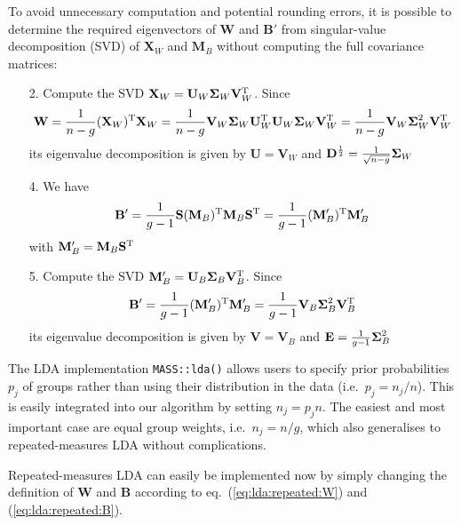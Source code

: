 \documentclass[a4paper]{article}
\begin{document}
To avoid unnecessary computation and potential rounding errors, it is possible to determine the required eigenvectors of $\mathbf{W}$ and $\mathbf{B}'$ from singular-value decomposition (SVD) of $\mathbf{X}_W$ and $\mathbf{M}_B$ without computing the full covariance matrices:

\begin{itemize}
\item[2.] Compute the SVD $\mathbf{X}_W = \mathbf{U}_W \boldsymbol{\Sigma}_W \mathbf{V}_W^{\text{T}}$. Since
  \[
    \mathbf{W} = \frac1{n - g} (\mathbf{X}_W)^{\text{T}} \mathbf{X}_W
    = \frac1{n - g} \mathbf{V}_W \boldsymbol{\Sigma}_W \mathbf{U}_W^{\text{T}} \mathbf{U}_W \boldsymbol{\Sigma}_W \mathbf{V}_W^{\text{T}}
    = \frac1{n - g} \mathbf{V}_W \boldsymbol{\Sigma}_W^2 \mathbf{V}_W^{\text{T}}
  \]
  its eigenvalue decomposition is given by $\mathbf{U} = \mathbf{V}_W$ and $\mathbf{D}^{\frac12} = \frac1{\sqrt{n - g}} \boldsymbol{\Sigma}_W$
\item[4.] We have
  \[
    \mathbf{B}' = \frac1{g - 1} \mathbf{S} (\mathbf{M}_B)^{\text{T}} \mathbf{M}_B \mathbf{S}^{\text{T}}
     = \frac1{g - 1} (\mathbf{M}_B')^{\text{T}} \mathbf{M}_B'
   \]
   with $\mathbf{M}_B' = \mathbf{M}_B \mathbf{S}^{\text{T}}$
\item[5.] Compute the SVD $\mathbf{M}_B' = \mathbf{U}_{B} \boldsymbol{\Sigma}_{B} \mathbf{V}_B^{\text{T}}$. Since
  \[
    \mathbf{B}' = \frac1{g - 1} (\mathbf{M}_B')^{\text{T}} \mathbf{M}_B'
    = \frac1{g - 1} \mathbf{V}_B \boldsymbol{\Sigma}_B^2 \mathbf{V}_B^{\text{T}}
  \]
  its eigenvalue decomposition is given by $\mathbf{V} = \mathbf{V}_B$ and $\mathbf{E} = \frac1{g - 1} \boldsymbol{\Sigma}_B^2$
\end{itemize}

The LDA implementation \texttt{MASS::lda()} allows users to specify prior probabilities $p_j$ of groups rather than using their distribution in the data (i.e.\ $p_j = n_j / n$). This is easily integrated into our algorithm by setting $n_j = p_j n$. The easiest and most important case are equal group weights, i.e.\ $n_j = n / g$, which also generalises to repeated-measures LDA without complications.

Repeated-measures LDA can easily be implemented now by simply changing the definition of $\mathbf{W}$ and $\mathbf{B}$ according to eq.~(\ref{eq:lda:repeated:W}) and (\ref{eq:lda:repeated:B}).
\end{document}
